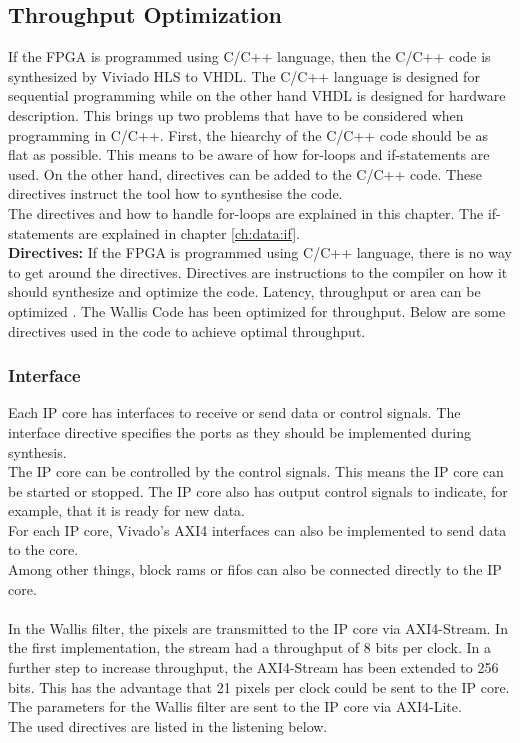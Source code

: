 \subsection{Throughput Optimization} \label{ch:ip:throughput}
If the FPGA is programmed using C/C++ language, then the C/C++ code is synthesized by Viviado HLS to VHDL. The C/C++ language is designed for sequential programming while on the other hand VHDL is designed for hardware description. This brings up two problems that have to be considered when programming in C/C++. First, the hiearchy of the C/C++ code should be as flat as possible. This means to be aware of how for-loops and if-statements are used. On the other hand, directives can be added to the C/C++ code. These directives instruct the tool how to synthesise the code.\\
The directives and how to handle for-loops are explained in this chapter. The if-statements are explained in chapter \ref{ch:data:if}. \\

\textbf{Directives:} If the FPGA is programmed using C/C++ language, there is no way to get around the directives. Directives are instructions to the compiler on how it should synthesize and optimize the code. Latency, throughput or area can be optimized \cite{pragma}. The Wallis Code has been optimized for throughput.
Below are some directives used in the code to achieve optimal throughput.


\subsubsection*{Interface}
Each IP core has interfaces to receive or send data or control signals. The interface directive specifies the ports as they should be implemented during synthesis. \\
The IP core can be controlled by the control signals. This means the IP core can be started or stopped. The IP core also has output control signals to indicate, for example, that it is ready for new data. \\
For each IP core, Vivado's AXI4 interfaces can also be implemented to send data to the core. \\
Among other things, block rams or fifos can also be connected directly to the IP core. \\
\\

In the Wallis filter, the pixels are transmitted to the IP core via AXI4-Stream. In the first implementation, the stream had a throughput of 8 bits per clock. In a further step to increase throughput, the AXI4-Stream has been extended to 256 bits. This has the advantage that 21 pixels per clock could be sent to the IP core. \\
The parameters for the Wallis filter are sent to the IP core via AXI4-Lite. \\
The used directives are listed in the listening below.

